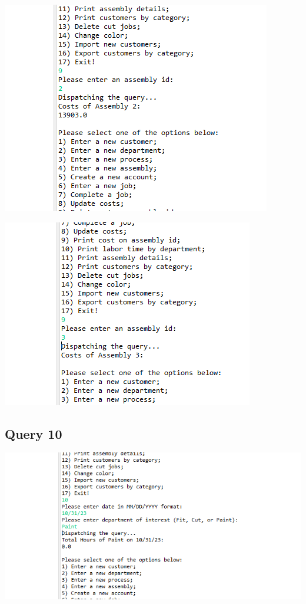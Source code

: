 \documentclass[11pt]{article}
\begin{document}
\includegraphics[width = \textwidth]{assCost12.png}

\includegraphics[width = \textwidth]{assCost13.png}
\subsection{Query 10}
\includegraphics[width = \textwidth]{Hours1.png}
\end{document}
